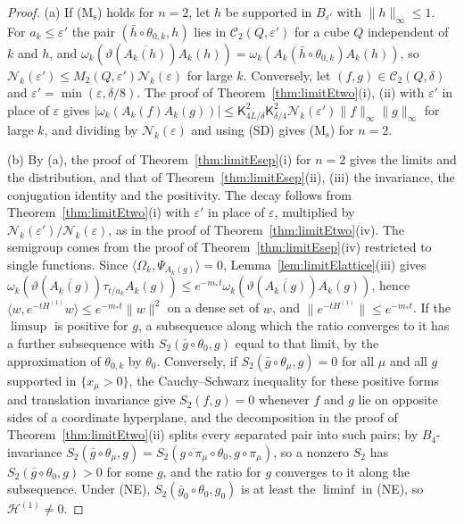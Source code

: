 \documentclass[aps,prd,twocolumn,superscriptaddress,nofootinbib,longbibliography,floatfix,amsmath,amssymb,10pt]{revtex4-2}
\theoremstyle{definition}
\theoremstyle{remark}
\newcommand{\ip}[2]{\langle #1,#2\rangle}
\begin{document}
\begin{proof}
(a) If (M$_{\mathrm s}$) holds for $n=2$, let $h$ be supported in
$B_{\varepsilon'}$ with $\|h\|_\infty\le1$. For $a_k\le\varepsilon'$ the pair
$(\bar h\circ\theta_{0,k},h)$ lies in $\mathcal C_2(Q,\varepsilon')$ for a
cube $Q$ independent of $k$ and $h$, and $\omega_k(\vartheta(\overline{
A_k(h)})A_k(h))=\omega_k(A_k(\bar h\circ\theta_{0,k})A_k(h))$, so
$\mathcal N_k(\varepsilon')\le M_2(Q,\varepsilon')\mathcal N_k(\varepsilon)$
for large $k$. Conversely, let $(f,g)\in\mathcal C_2(Q,\delta)$ and
$\varepsilon'=\min(\varepsilon,\delta/8)$. The proof of
Theorem~\ref{thm:limitEtwo}(i), (ii) with $\varepsilon'$ in place of
$\varepsilon$ gives $|\omega_k(A_k(f)A_k(g))|\le\mathsf K_{4L/\delta}^2
\mathsf K_{\delta/4}^2\mathcal N_k(\varepsilon')\|f\|_\infty\|g\|_\infty$
for large $k$, and dividing by $\mathcal N_k(\varepsilon)$ and using (SD)
gives (M$_{\mathrm s}$) for $n=2$.

(b) By (a), the proof of Theorem~\ref{thm:limitEsep}(i) for $n=2$ gives the
limits and the distribution, and that of Theorem~\ref{thm:limitEsep}(ii),
(iii) the invariance, the conjugation identity and the positivity. The
decay follows from Theorem~\ref{thm:limitEtwo}(i) with $\varepsilon'$ in
place of $\varepsilon$, multiplied by $\mathcal N_k(\varepsilon')/\mathcal
N_k(\varepsilon)$, as in the proof of Theorem~\ref{thm:limitEtwo}(iv).
The semigroup comes from the proof of Theorem~\ref{thm:limitEsep}(iv)
restricted to single functions. Since $\ip{\Omega_k}{\Psi_{A_k(g)}}=0$,
Lemma~\ref{lem:limitElattice}(iii) gives $\omega_k(\vartheta(\overline{
A_k(g)})\tau_{t/a_k}A_k(g))\le e^{-m_*t}\omega_k(\vartheta(\overline{
A_k(g)})A_k(g))$, hence $\ip w{e^{-tH^{(1)}}w}\le e^{-m_*t}\|w\|^2$ on a dense
set of $w$, and $\|e^{-tH^{(1)}}\|\le e^{-m_*t}$. If the $\limsup$ is
positive for $g$, a subsequence along which the ratio converges to it has a
further subsequence with $S_2(\bar g\circ\theta_0,g)$ equal to that limit,
by the approximation of $\theta_{0,k}$ by $\theta_0$. Conversely, if
$S_2(\bar g\circ\theta_\mu,g)=0$ for all $\mu$ and all $g$ supported in
$\{x_\mu>0\}$, the Cauchy--Schwarz inequality for these positive forms and
translation invariance give $S_2(f,g)=0$ whenever $f$ and $g$ lie on
opposite sides of a coordinate hyperplane, and the decomposition in the
proof of Theorem~\ref{thm:limitEtwo}(ii) splits every separated pair into
such pairs; by $B_4$-invariance $S_2(\bar g\circ\theta_\mu,g)=S_2(\overline{
g\circ\pi_\mu}\circ\theta_0,g\circ\pi_\mu)$, so a nonzero $S_2$ has
$S_2(\bar g\circ\theta_0,g)>0$ for some $g$, and the ratio for $g$ converges
to it along the subsequence. Under (NE), $S_2(\bar g_0\circ\theta_0,g_0)$ is
at least the $\liminf$ in (NE), so $\mathcal H^{(1)}\ne0$.
\end{proof}
\end{document}
